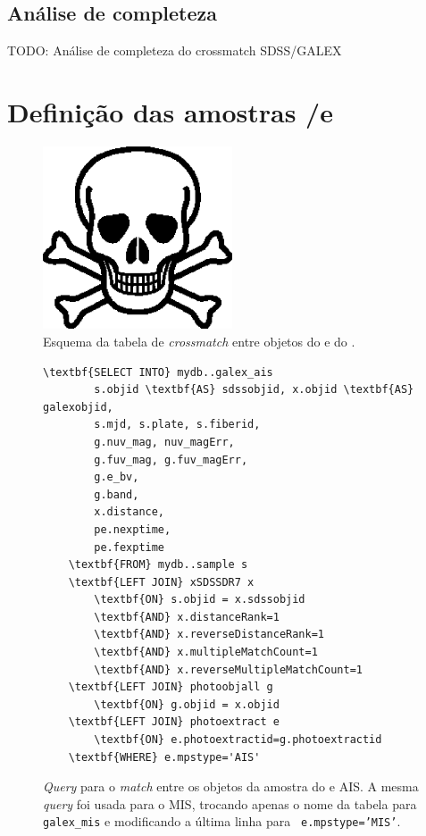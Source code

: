\subsection{Análise de completeza}
TODO: Análise de completeza do crossmatch SDSS/GALEX


\section{Definição das amostras \SDSS/\starlight e \galex}
\label{sec:Crossmatch:DefAmostras}


\begin{figure}
	\includegraphics[width=0.5\textwidth]{figuras/test.eps}
	\caption[Esquema da tabela de {em crossmatch} entre objetos do \galex e do
	\SDSS.]
	{Esquema da tabela de {\em crossmatch} entre objetos do \galex e do
	\SDSS.}
	\label{fig:TabelaxSDSSDR7}
\end{figure}

\begin{figure}
	\begin{Verbatim}[commandchars=\\\{\}]
	\textbf{SELECT INTO} mydb..galex_ais
		s.objid \textbf{AS} sdssobjid, x.objid \textbf{AS} galexobjid,
		s.mjd, s.plate, s.fiberid,
		g.nuv_mag, nuv_magErr,
		g.fuv_mag, g.fuv_magErr,
		g.e_bv,
		g.band,
		x.distance,
		pe.nexptime,
		pe.fexptime
	\textbf{FROM} mydb..sample s
	\textbf{LEFT JOIN} xSDSSDR7 x
		\textbf{ON} s.objid = x.sdssobjid
		\textbf{AND} x.distanceRank=1
		\textbf{AND} x.reverseDistanceRank=1
		\textbf{AND} x.multipleMatchCount=1
		\textbf{AND} x.reverseMultipleMatchCount=1
	\textbf{LEFT JOIN} photoobjall g
		\textbf{ON} g.objid = x.objid
	\textbf{LEFT JOIN} photoextract e
		\textbf{ON} e.photoextractid=g.photoextractid
	\textbf{WHERE} e.mpstype='AIS'
	\end{Verbatim}
	\caption[{\em Query} para o {\em match} entre os objetos da amostra do
	\starlight e \galex AIS.]
	{{\em Query} para o {\em match} entre os objetos da amostra do \starlight e
	\galex AIS. A mesma {\em query} foi usada para o MIS, trocando apenas o nome da
	tabela para {\tt galex\_mis} e modificando a última linha para {\tt
	e.mpstype='MIS'}.}
	\label{fig:QueryMatchAIS}
\end{figure}


